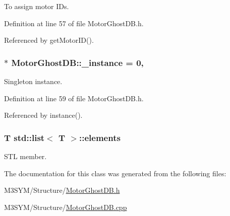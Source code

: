 To assign motor I\+Ds. 



Definition at line 57 of file Motor\+Ghost\+D\+B.\+h.



Referenced by get\+Motor\+I\+D().

\hypertarget{classMotorGhostDB_aa7624b432ffda929888975ee71cd2d84}{
\subsubsection[{\+\_\+instance}]{ $\ast$ Motor\+Ghost\+D\+B\+::\+\_\+instance = 0\hspace{0.3cm}{\ttfamily [static]}, {\ttfamily [private]}}}\label{classMotorGhostDB_aa7624b432ffda929888975ee71cd2d84}


Singleton instance. 



Definition at line 59 of file Motor\+Ghost\+D\+B.\+h.



Referenced by instance().

\hypertarget{classstd_1_1list_a682e5c7c91eb377d0cb4f019b2b81a5d}{
\subsubsection[{elements}]{\setlength{\rightskip}{0pt plus 5cm}T std\+::list$<$ T $>$\+::elements\hspace{0.3cm}{\ttfamily [inherited]}}}\label{classstd_1_1list_a682e5c7c91eb377d0cb4f019b2b81a5d}


S\+T\+L member. 



The documentation for this class was generated from the following files\+:\begin{DoxyCompactItemize}
\item 
M3\+S\+Y\+M/\+Structure/\hyperlink{MotorGhostDB_8h}{Motor\+Ghost\+D\+B.\+h}\item 
M3\+S\+Y\+M/\+Structure/\hyperlink{MotorGhostDB_8cpp}{Motor\+Ghost\+D\+B.\+cpp}\end{DoxyCompactItemize}
